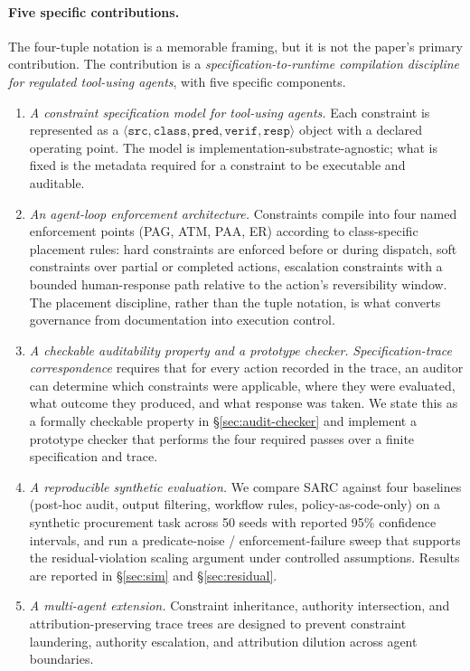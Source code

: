 \documentclass[11pt,a4paper]{article}
\theoremstyle{remark}
\begin{document}
\paragraph{Five specific contributions.} The four-tuple notation is a memorable framing, but it is not the paper's primary contribution. The contribution is a \emph{specification-to-runtime compilation discipline for regulated tool-using agents}, with five specific components.

\begin{enumerate}[leftmargin=2em,topsep=0.3em,itemsep=0.3em]
\item \emph{A constraint specification model for tool-using agents.} Each constraint is represented as a $\langle\texttt{src}, \texttt{class}, \texttt{pred}, \texttt{verif}, \texttt{resp}\rangle$ object with a declared operating point. The model is implementation-substrate-agnostic; what is fixed is the metadata required for a constraint to be executable and auditable.

\item \emph{An agent-loop enforcement architecture.} Constraints compile into four named enforcement points (PAG, ATM, PAA, ER) according to class-specific placement rules: hard constraints are enforced before or during dispatch, soft constraints over partial or completed actions, escalation constraints with a bounded human-response path relative to the action's reversibility window. The placement discipline, rather than the tuple notation, is what converts governance from documentation into execution control.

\item \emph{A checkable auditability property and a prototype checker.} \emph{Specification-trace correspondence} requires that for every action recorded in the trace, an auditor can determine which constraints were applicable, where they were evaluated, what outcome they produced, and what response was taken. We state this as a formally checkable property in \S\ref{sec:audit-checker} and implement a prototype checker that performs the four required passes over a finite specification and trace.

\item \emph{A reproducible synthetic evaluation.} We compare SARC against four baselines (post-hoc audit, output filtering, workflow rules, policy-as-code-only) on a synthetic procurement task across 50 seeds with reported 95\% confidence intervals, and run a predicate-noise / enforcement-failure sweep that supports the residual-violation scaling argument under controlled assumptions. Results are reported in \S\ref{sec:sim} and \S\ref{sec:residual}.

\item \emph{A multi-agent extension.} Constraint inheritance, authority intersection, and attribution-preserving trace trees are designed to prevent constraint laundering, authority escalation, and attribution dilution across agent boundaries.
\end{enumerate}
\end{document}
